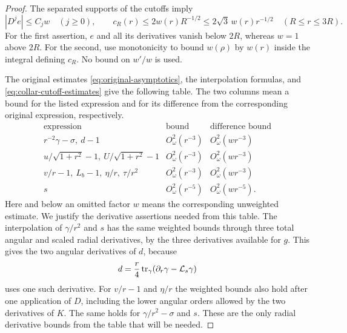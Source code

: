 \begin{proof}
The separated supports of the cutoffs imply
\begin{equation}\label{eq:collar-cutoff-estimates}
 |D^j e|\leq C_jw\quad(j\geq0),\qquad
 c_R(r)\leq2w(r)R^{-1/2}\leq2\sqrt3\,w(r)r^{-1/2}
 \quad(R\leq r\leq3R).
\end{equation}
For the first assertion, $e$ and all its derivatives vanish below $2R$,
whereas $w=1$ above $2R$.  For the second, use monotonicity to bound
$w(\rho)$ by $w(r)$ inside the integral defining $c_R$.  No bound on
$w'/w$ is used.

The original estimates \eqref{eq:original-asymptotics}, the interpolation
formulas, and \eqref{eq:collar-cutoff-estimates} give the following table.
The two columns mean a bound for the listed expression and for its
difference from the corresponding original expression, respectively.
\begin{equation}\label{eq:collar-weighted-table}
\begin{array}{c|c|c}
 \text{expression}&\text{bound}&\text{difference bound}\\ \hline
 r^{-2}\gamma-\sigma,\ d-1
   &O^2_\omega(r^{-3})&O^2_\omega(wr^{-3})\\
 u/\sqrt{1+r^2}-1,\ U/\sqrt{1+r^2}-1
   &O^2_\omega(r^{-3})&O^2_\omega(wr^{-3})\\
 v/r-1,\ L_b-1,\ \eta/r,\ \tau/r^2
   &O^2_\omega(r^{-3})&O^2_\omega(wr^{-3})\\
 s&O^2_\omega(r^{-5})&O^2_\omega(wr^{-5}).
\end{array}
\end{equation}
Here and below an omitted factor $w$ means the corresponding unweighted
estimate.  We justify the derivative assertions needed from this table.
The interpolation of $\gamma/r^2$ and $s$ has the same weighted bounds
through three total angular and scaled radial derivatives, by the three
derivatives available for $g$.  This gives the two angular derivatives of
$d$, because
\[
 d=\frac r4\operatorname{tr}_\gamma(\partial_r\gamma-\mathcal L_s\gamma)
\]
uses one such derivative.  For $v/r-1$ and $\eta/r$ the weighted bounds
also hold after one application of $D$, including the lower angular
orders allowed by the two derivatives of $K$.  The same holds for
$\gamma/r^2-\sigma$ and $s$.  These are the only radial derivative bounds
from the table that will be needed.


\end{proof}
